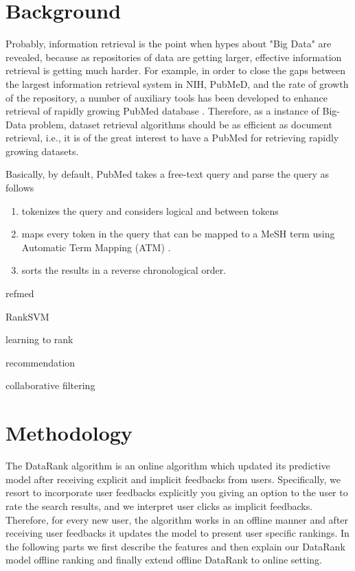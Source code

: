 \documentclass[twoside,11pt]{article}
\begin{document}
\section{Background} \label{sec:background}
Probably, information retrieval is the point when hypes about "Big Data" are revealed, because as repositories of data are getting larger, effective information retrieval is getting much harder. For example, in order to close the gaps between the largest information retrieval system in NIH, PubMeD, and the rate of growth of the repository, a number of auxiliary tools has been developed to enhance retrieval of rapidly growing PubMed database \cite{pubmed-survey}. Therefore, as a instance of Big-Data problem, dataset retrieval algorithms should be as efficient as document retrieval, i.e.,  it is of the great  interest to have a PubMed for retrieving rapidly growing datasets.

Basically, by default, PubMed takes a free-text query and parse the query as follows
\begin{enumerate}
\item tokenizes the query and considers logical and between tokens
\item maps every token in the query that can be mapped to a MeSH term using Automatic Term Mapping (ATM) \cite{pubmed-atm}.
\item sorts the results in a reverse chronological order.
\end{enumerate}


refmed \cite{refmed}

RankSVM \citep{svm-rank-j}

learning to rank \cite{yahoo-rank-challange}

recommendation 
\cite{recommender-survey}

collaborative filtering
\cite{cff-survey}

\section{Methodology} \label{sec:methodology}
The DataRank algorithm is an online algorithm which updated its predictive model after receiving explicit and implicit feedbacks from users. Specifically, we resort to incorporate user feedbacks explicitly you giving an option to the user to rate the search results, and we interpret user clicks as implicit feedbacks. Therefore, for every new user, the algorithm works in an offline manner and after receiving user feedbacks it updates the model to present user specific rankings. In the following parts we first describe the features and then explain our DataRank model offline ranking and finally extend offline DataRank to online setting.
\end{document}
